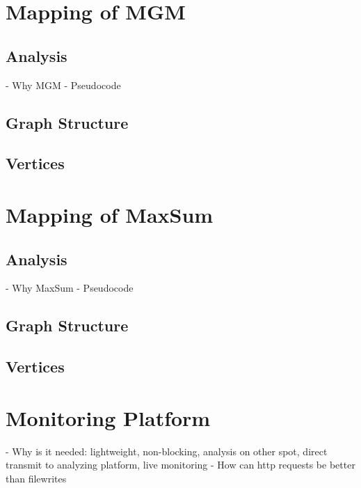 \section{Mapping of MGM}
\subsection{Analysis}

     - Why MGM
    - Pseudocode

\subsection{Graph Structure}
\subsection{Vertices}

\section{Mapping of MaxSum}
\subsection{Analysis}
    
    - Why MaxSum
    - Pseudocode

\subsection{Graph Structure}
\subsection{Vertices}

\section{Monitoring Platform}

    - Why is it needed: lightweight, non-blocking, analysis on other spot, direct transmit to analyzing platform, live monitoring
    - How can http requests be better than filewrites
